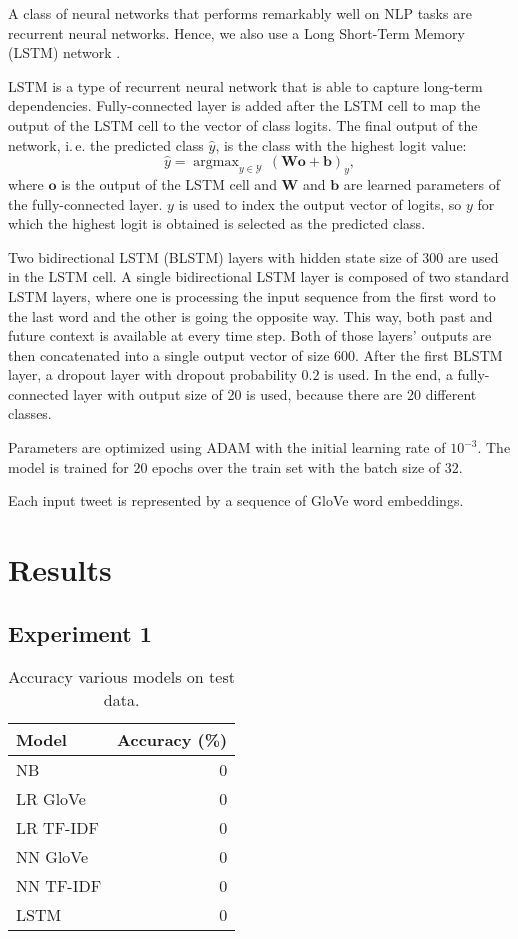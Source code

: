 \documentclass[10pt, a4paper]{article}
\DeclareMathOperator*{\argmax}{argmax}
\begin{document}
A class of neural networks that performs remarkably well on NLP tasks are 
recurrent neural networks. Hence, we also use a Long Short-Term Memory (LSTM) 
network \citep{hochreiter1997long}.

LSTM is a type of recurrent neural network that is able to capture long-term 
dependencies. Fully-connected layer is added after the LSTM cell to map the 
output of the LSTM cell to the vector of class logits. The final output of the 
network, i.\,e. the predicted class $\hat{y}$, is the class with the highest 
logit value:
$$\hat{y} = \argmax_{y \in \mathcal{Y}} 
    \,(\mathbf{W} \mathbf{o} + \mathbf{b})_y,$$
where $\mathbf{o}$ is the output of the LSTM cell and $\mathbf{W}$ and 
$\mathbf{b}$ are learned parameters of the fully-connected layer. $y$ is used to
index the output vector of logits, so $y$ for which the highest logit is 
obtained is selected as the predicted class.

Two bidirectional LSTM (BLSTM) layers with hidden state size of 300 are used in 
the LSTM cell. A single bidirectional LSTM layer is composed of two standard 
LSTM layers, where one is processing the input sequence from the first word to 
the last word and the other is going the opposite way. This way, both past and 
future context is available at every time step. Both of those layers' outputs 
are then concatenated into a single output vector of size 600. After the first 
BLSTM layer, a dropout layer with dropout probability $0.2$ is used. In the end,
a fully-connected layer with output size of 20 is used, because there are 20 
different classes.

Parameters are optimized using ADAM \citep{kingma2014adam} with the initial 
learning rate of $10^{-3}$. The model is trained for $20$ epochs over the train 
set with the batch size of $32$.

Each input tweet is represented by a sequence of GloVe word embeddings.

\section{Results}

\subsection{Experiment 1}

\begin{table}
\caption{Accuracy various models on test data.}
\label{tab:accuracy}
\begin{center}
\begin{tabular}{lr}
\toprule
Model & Accuracy (\%) \\
\midrule
NB            & 0 \\
LR GloVe      & 0 \\
LR TF-IDF     & 0 \\
NN GloVe      & 0 \\
NN TF-IDF     & 0 \\
LSTM          & 0 \\
\bottomrule
\end{tabular}
\end{center}
\end{table}
\end{document}
